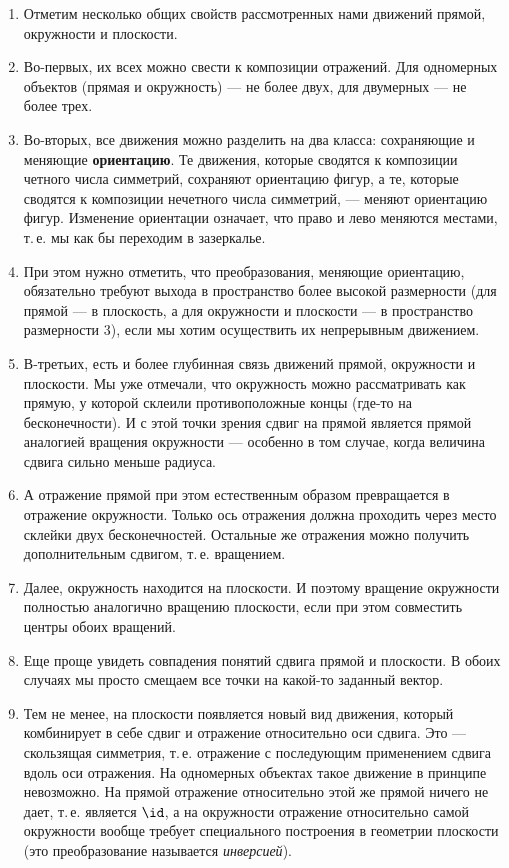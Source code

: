 \begin{enumerate}
\item Отметим несколько общих свойств рассмотренных нами движений прямой, окружности и плоскости.
\item Во-первых, их всех можно свести к композиции отражений. Для одномерных объектов (прямая и окружность) --- не более двух, для двумерных --- не более трех.
\item Во-вторых, все движения можно разделить на два класса: сохраняющие и меняющие \textbf{ориентацию}. Те движения, которые сводятся к композиции четного числа симметрий, сохраняют ориентацию фигур, а те, которые сводятся к композиции нечетного числа симметрий, --- меняют ориентацию фигур. Изменение ориентации означает, что право и лево меняются местами, т.\,е. мы как бы переходим в зазеркалье. 
\item При этом нужно отметить, что преобразования, меняющие ориентацию, обязательно требуют выхода в пространство более высокой размерности (для прямой --- в плоскость, а для окружности и плоскости --- в пространство размерности 3), если мы хотим осуществить их непрерывным движением.
\item В-третьих, есть и более глубинная связь движений прямой, окружности и плоскости. Мы уже отмечали, что окружность можно рассматривать как прямую, у которой склеили противоположные концы (где-то на бесконечности). И с этой точки зрения сдвиг на прямой является прямой аналогией вращения окружности --- особенно в том случае, когда величина сдвига сильно меньше радиуса.
\item А отражение прямой при этом естественным образом превращается в отражение окружности. Только ось отражения должна проходить через место склейки двух бесконечностей. Остальные же отражения можно получить дополнительным сдвигом, т.\,е. вращением.
\item Далее, окружность находится на плоскости. И поэтому вращение окружности полностью аналогично вращению плоскости, если при этом совместить центры обоих вращений.
\item Еще проще увидеть совпадения понятий сдвига прямой и плоскости. В обоих случаях мы просто смещаем все точки на какой-то заданный вектор.
\item Тем не менее, на плоскости появляется новый вид движения, который комбинирует в себе сдвиг и отражение относительно оси сдвига. Это --- скользящая симметрия, т.\,е. отражение с последующим применением сдвига вдоль оси отражения. На одномерных объектах такое движение в принципе невозможно. На прямой отражение относительно этой же прямой ничего не дает, т.\,е. является $\id$, а на окружности отражение относительно самой окружности вообще требует специального построения в геометрии плоскости (это преобразование называется \textit{инверсией}).
\end{enumerate}




